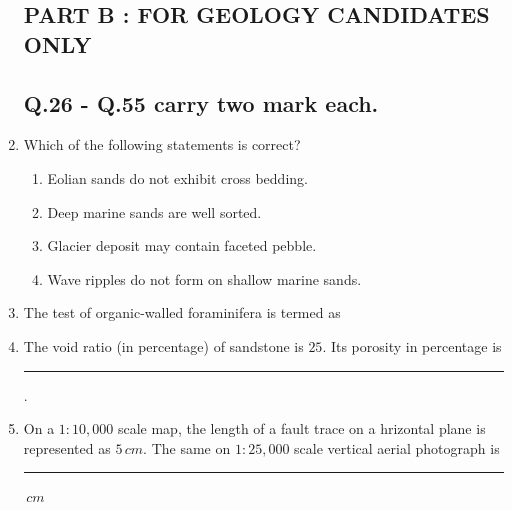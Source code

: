 \documentclass[journal,12pt,onecolumn]{IEEEtran}
\theoremstyle{remark}
\begin{document}
\begin{enumerate}
        \newpage

    \begin{center}
        \subsection*{PART B : FOR GEOLOGY CANDIDATES ONLY}
    \end{center}
    
    \subsection*{Q.26 - Q.55 carry two mark each.}

        \item Which of the following statements is correct? \hfill{}
            \begin{enumerate}
                \item Eolian sands do not exhibit cross bedding.
                \item Deep marine sands are well sorted.
                \item Glacier deposit may contain faceted pebble.
                \item Wave ripples do not form on shallow marine sands.
            \end{enumerate}

        \item The test of organic-walled foraminifera is termed as \hfill{}
            \begin{enumerate}
            \end{enumerate}

        \item The void ratio (in percentage) of sandstone is $25$. Its porosity in percentage is \rule{3cm}{0.15mm}. \hfill{}

        \item On a $1:10,000$ scale map, the length of a fault trace on a hrizontal plane is represented as $5\,cm$. The same on $1:25,000$ scale vertical aerial photograph is \rule{3cm}{0.15mm} $\,cm$ \hfill{}


\end{enumerate}
\end{document}
